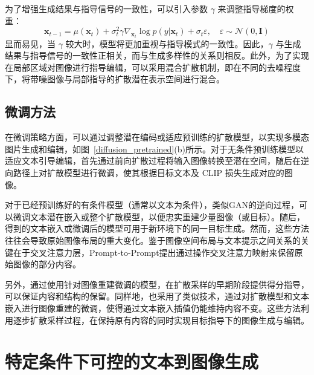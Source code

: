 为了增强生成结果与指导信号的一致性，可以引入参数 \(\gamma\) 来调整指导梯度的权重：
\begin{equation}
    \mathbf{x}_{t-1} = \mu(\mathbf{x}_t) + \sigma_t^2 \gamma \nabla_{\mathbf{x}_t} \log p(y|\mathbf{x}_t) + \sigma_t \varepsilon, \quad \varepsilon \sim \mathcal{N}(0, \mathbf{I})
\end{equation}
显而易见，当 \(\gamma\) 较大时，模型将更加重视与指导模式的一致性。因此，\(\gamma\) 与生成结果与指导信号的一致性正相关，而与生成多样性的关系则相反\cite{dhariwal2021diffusion}。此外，为了实现在局部区域对图像进行指导编辑，可以采用混合扩散机制\cite{avrahami2021blended}，即在不同的去噪程度下，将带噪图像与局部指导的扩散潜在表示空间进行混合。

\subsection{微调方法}
\label{fine_tuning_methods}

在微调策略方面，可以通过调整潜在编码或适应预训练的扩散模型，以实现多模态图片生成和编辑，如图~\ref{diffusion_pretrained}(b)所示。对于无条件预训练模型以适应文本引导编辑，首先通过前向扩散过程将输入图像转换至潜在空间，随后在逆向路径上对扩散模型进行微调，使其根据目标文本及 CLIP 损失生成对应的图像\cite{kim2021diffusionclip}。

对于已经预训练好的有条件模型（通常以文本为条件），类似GAN的逆向过程，可以微调文本潜在嵌入或整个扩散模型，以便忠实重建少量图像（或目标）\cite{ruiz2022dreambooth, gal2022image}。随后，得到的文本嵌入或微调后的模型可用于新环境下的同一目标生成。然而，这些方法\cite{ruiz2022dreambooth, gal2022image}往往会导致原始图像布局的重大变化。鉴于图像空间布局与文本提示之间关系的关键在于交叉注意力层，Prompt-to-Prompt\cite{hertz2022prompt}提出通过操作交叉注意力映射来保留原始图像的部分内容。

另外，通过使用针对图像重建微调的模型，在扩散采样的早期阶段提供得分指导，可以保证内容和结构的保留\cite{zhang2022sine}。同样地，\cite{kawar2022imagic}也采用了类似技术，通过对扩散模型和文本嵌入进行图像重建的微调，使得通过文本嵌入插值仍能维持内容不变。这些方法利用逐步扩散采样过程，在保持原有内容的同时实现目标指导下的图像生成与编辑。


\section{特定条件下可控的文本到图像生成}
\label{sec:method}


